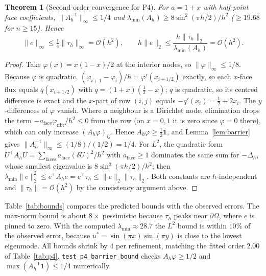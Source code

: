 \documentclass[11pt,a4paper]{article}
\newtheorem{theorem}{Theorem}
\begin{document}
\begin{theorem}[Second-order convergence for P4]\label{thm:p4}
For \(a=1+x\) with half-point face coefficients, \(\|A_h^{-1}\|_\infty\le 1/4\) and \(\lambda_{\min}(A_h)\ge 8\sin^2(\pi h/2)/h^2\) (\(\ge 19.68\) for \(n\ge 15\)). Hence
\[
\|e\|_\infty\le\tfrac14\|\tau_h\|_\infty=\mathcal{O}(h^2),\qquad
h\|e\|_2\le\frac{h\|\tau_h\|_2}{\lambda_{\min}(A_h)}=\mathcal{O}(h^2).
\]
\end{theorem}
\begin{proof}
Take \(\varphi(x)=x(1-x)/2\) at the interior nodes, so \(\|\varphi\|_\infty\le 1/8\).
Because \(\varphi\) is quadratic, \((\varphi_{i+1}-\varphi_i)/h=\varphi'(x_{i+1/2})\) exactly, so each \(x\)-face flux equals \(q(x_{i+1/2})\) with \(q=(1+x)(\tfrac12-x)\); \(q\) is quadratic, so its centred difference is exact and the \(x\)-part of row \((i,j)\) equals \(-q'(x_i)=\tfrac12+2x_i\).
The \(y\)-differences of \(\varphi\) vanish.
Where a neighbour is a Dirichlet node, elimination drops the term \(-a_{\mathrm{face}}\varphi_{\mathrm{nbr}}/h^2\le 0\) from the row (on \(x=0,1\) it is zero since \(\varphi=0\) there), which can only increase \((A_h\varphi)_{ij}\).
Hence \(A_h\varphi\ge\tfrac12\mathbf{1}\), and Lemma~\ref{lem:barrier} gives \(\|A_h^{-1}\|_\infty\le(1/8)/(1/2)=1/4\).
For \(L^2\), the quadratic form \(U^\top A_hU=\sum_{\mathrm{faces}}a_{\mathrm{face}}(\delta U)^2/h^2\) with \(a_{\mathrm{face}}\ge 1\) dominates the same sum for \(-\Delta_h\), whose smallest eigenvalue is \(8\sin^2(\pi h/2)/h^2\); then \(\lambda_{\min}\|e\|_2^2\le e^\top A_he=e^\top\tau_h\le\|e\|_2\|\tau_h\|_2\).
Both constants are \(h\)-independent and \(\|\tau_h\|=\mathcal{O}(h^2)\) by the consistency argument above.
\end{proof}

Table~\ref{tab:bounds} compares the predicted bounds with the observed errors.
The max-norm bound is about \(8\times\) pessimistic because \(\tau_h\) peaks near \(\partial\Omega\), where \(e\) is pinned to zero.
With the computed \(\lambda_{\min}\approx 28.7\) the \(L^2\) bound is within \(10\%\) of the observed error, because \(u^*=\sin(\pi x)\sin(\pi y)\) is close to the lowest eigenmode.
All bounds shrink by \(4\) per refinement, matching the fitted order \(2.00\) of Table~\ref{tab:p4}.
\texttt{test\_p4\_barrier\_bound} checks \(A_h\varphi\ge 1/2\) and \(\max(A_h^{-1}\mathbf{1})\le 1/4\) numerically.
\end{document}
